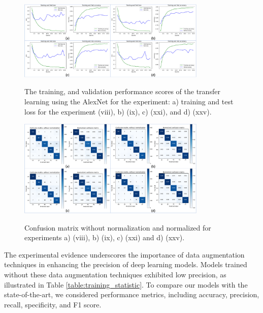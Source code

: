 \documentclass[journal]{IEEEtran}
\begin{document}
\begin{figure}
\centering
{\includegraphics[width=0.8\textwidth,keepaspectratio]{img/curvas_entrenamiento.png}}
\caption{The training, and validation performance scores of the transfer learning using the AlexNet for the experiment: a) training and test loss for the experiment (viii), b) (ix), c) (xxi), and d) (xxv).}
\label{fig:da_training}
\end{figure}
\begin{figure}
\centering
{\includegraphics[width=0.8\textwidth,keepaspectratio]{img/matriz_confusion.png}}
\caption{Confusion matrix without normalization and normalized for experiments a) (viii), b) (ix), c) (xxi) and d) (xxv).}
\label{fig:da_confusion_matrix}
\end{figure}

The experimental evidence underscores the importance of data augmentation techniques in enhancing the precision of deep learning models. Models trained without these data augmentation techniques exhibited low precision, as illustrated in Table \ref{table:training_statistic}.
To compare our models with the state-of-the-art, we considered performance metrics, including accuracy, precision, recall, specificity, and F1 score.
\end{document}
